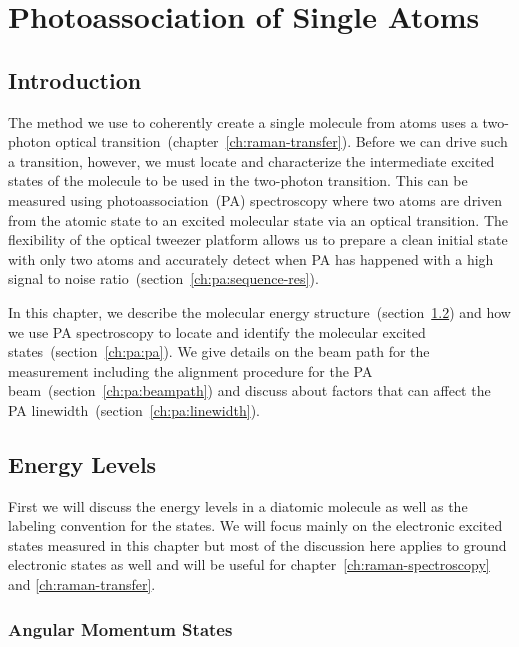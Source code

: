
\chapter{Photoassociation of Single Atoms}
\label{ch:pa}

\section{Introduction}

The method we use to coherently create a single molecule from atoms
uses a two-photon optical transition~(chapter~\ref{ch:raman-transfer}).
Before we can drive such a transition, however, we must locate and characterize
the intermediate excited states of the molecule to be used in the two-photon transition.
This can be measured using photoassociation~(PA) spectroscopy
where two atoms are driven from the atomic state to an excited molecular state
via an optical transition.
The flexibility of the optical tweezer platform allows us to
prepare a clean initial state with only two atoms
and accurately detect when PA has happened
with a high signal to noise ratio~(section~\ref{ch:pa:sequence-res}).

In this chapter, we describe the molecular energy structure~(section~\ref{ch:pa:structure})
and how we use PA spectroscopy to locate and
identify the molecular excited states~(section~\ref{ch:pa:pa}).
We give details on the beam path for the measurement including
the alignment procedure for the PA beam~(section~\ref{ch:pa:beampath})
and discuss about factors that can affect
the PA linewidth~(section~\ref{ch:pa:linewidth}).

\section{Energy Levels}
\label{ch:pa:structure}

First we will discuss the energy levels in a diatomic molecule
as well as the labeling convention for the states.
We will focus mainly on the electronic excited states measured in this chapter
but most of the discussion here applies to ground electronic states as well
and will be useful for chapter~\ref{ch:raman-spectroscopy} and \ref{ch:raman-transfer}.

\subsection{Angular Momentum States}

